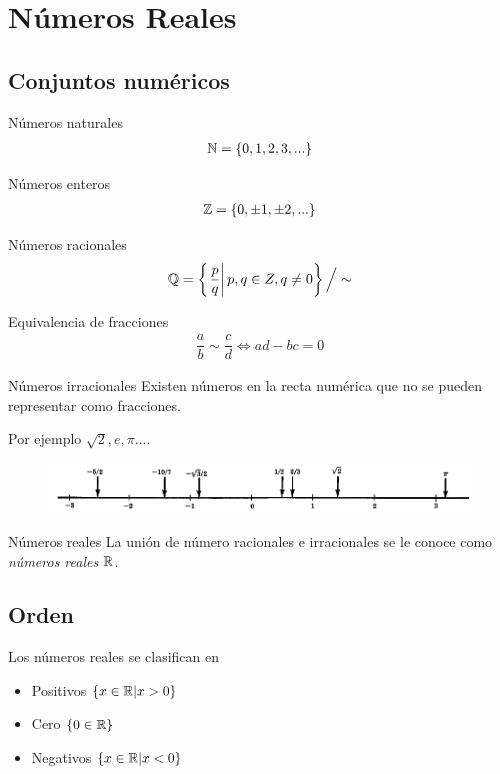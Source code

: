 \section{Números Reales}
\subsection{Conjuntos numéricos}
{Números naturales}
	\begin{align*}
		\mathbb{N} = \left\{ 0,1,2,3,... \right\}
	\end{align*}

{Números enteros}
	\begin{align*}
		\mathbb{Z} = \left\{ 0,\pm1, \pm 2,... \right\}
	\end{align*}

{Números racionales}
	\begin{align*}
		\mathbb{Q} = \left\{ \left.\dfrac{p}{q} \right| p,q\in Z, q\neq 0 \right\}\Big/\sim
	\end{align*}

{Equivalencia de fracciones}
	\begin{align*}
		\dfrac{a}{b}\sim \dfrac{c}{d} \iff ad-bc=0 
	\end{align*}

{Números irracionales}
	Existen números en la recta numérica que no se pueden representar como fracciones.
	
	Por ejemplo $\sqrt{2}, e, \pi...$.

{}
\begin{figure}
 \centering
 \includegraphics[width=.8\textwidth]{./calculo/fig-01-01--recta_numerica.png}
 \label{fig:schaum 01 01}
\end{figure}


{Números reales}
	La unión de número racionales e irracionales se le conoce como \emph{números reales} $\mathbb{R}$.

\subsection{Orden}

	Los números reales se clasifican en
	\begin{itemize}
		\item Positivos $\left\{ x\in \mathbb{R}| x>0 \right\}$ 
		\item Cero $\left\{ 0\in \mathbb{R} \right\}$ 
		\item Negativos $\left\{ x\in \mathbb{R} | x<0 \right\}$
	\end{itemize}

